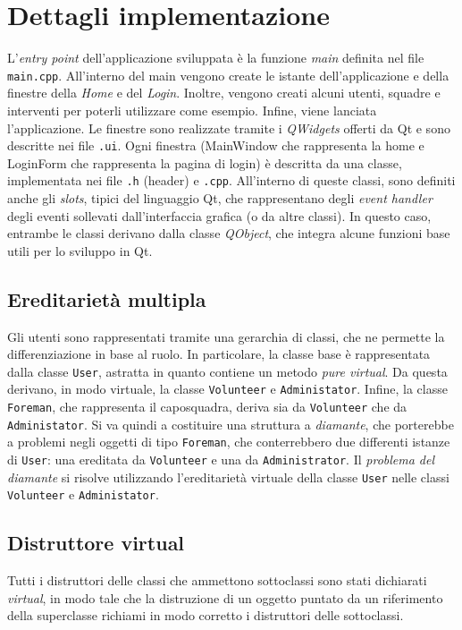 \section{Dettagli implementazione}
L'\textit{entry point} dell'applicazione sviluppata è la funzione \textit{main} definita nel file \texttt{main.cpp}. All'interno del main vengono create le istante dell'applicazione e della finestre della \textit{Home} e del \textit{Login}. Inoltre, vengono creati alcuni utenti, squadre e interventi per poterli utilizzare come esempio. Infine, viene lanciata l'applicazione. Le finestre sono realizzate tramite i \textit{QWidgets} offerti da Qt e sono descritte nei file \texttt{.ui}. Ogni finestra (MainWindow che rappresenta la home e LoginForm che rappresenta la pagina di login) è descritta da una classe, implementata nei file \texttt{.h} (header) e \texttt{.cpp}. All'interno di queste classi, sono definiti anche gli \textit{slots}, tipici del linguaggio Qt, che rappresentano degli \textit{event handler} degli eventi sollevati dall'interfaccia grafica (o da altre classi). In questo caso, entrambe le classi derivano dalla classe \textit{QObject}, che integra alcune funzioni base utili per lo sviluppo in Qt.

\subsection{Ereditarietà multipla}
Gli utenti sono rappresentati tramite una gerarchia di classi, che ne permette la differenziazione in base al ruolo. In particolare, la classe base è rappresentata dalla classe \texttt{User}, astratta in quanto contiene un metodo \textit{pure virtual}. Da questa derivano, in modo virtuale, la classe \texttt{Volunteer} e \texttt{Administator}. Infine, la classe \texttt{Foreman}, che rappresenta il caposquadra, deriva sia da \texttt{Volunteer} che da \texttt{Administator}. Si va quindi a costituire una struttura a \textit{diamante}, che porterebbe a problemi negli oggetti di tipo \texttt{Foreman}, che conterrebbero due differenti istanze di \texttt{User}: una ereditata da \texttt{Volunteer} e una da \texttt{Administrator}. Il \textit{problema del diamante} si risolve utilizzando l'ereditarietà virtuale della classe \texttt{User} nelle classi \texttt{Volunteer} e \texttt{Administator}.



\subsection{Distruttore virtual}
Tutti i distruttori delle classi che ammettono sottoclassi sono stati dichiarati \textit{virtual}, in modo tale che la distruzione di un oggetto puntato da un riferimento della superclasse richiami in modo corretto i distruttori delle sottoclassi.


